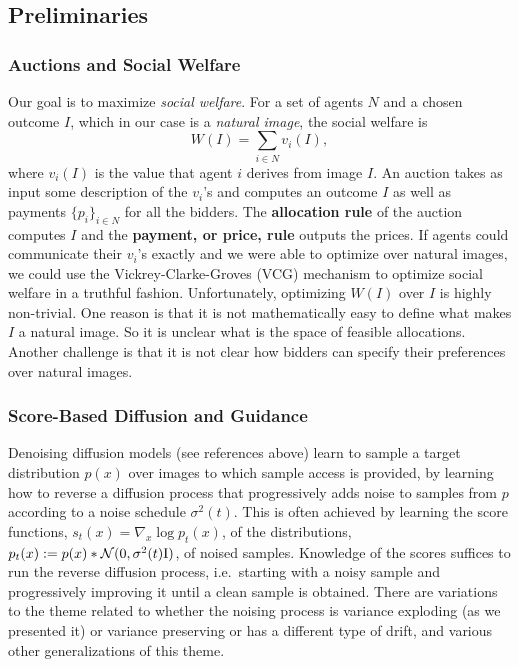 \documentclass[format=acmsmall, review=false]{acmart}
\begin{document}
\subsection{Preliminaries}
\label{sec:preliminaries}

\subsubsection{Auctions and Social Welfare}
Our goal is to maximize {\em social welfare}. For a set of agents $N$ and a chosen outcome $I$, which in our case is a {\em natural image}, the social welfare is 
\begin{equation}
W(I) = \sum_{i \in N} v_i(I),
\end{equation}
where $v_i(I)$ is the value that agent $i$ derives from image $I$. An auction takes as input some description of the $v_i$'s and computes an outcome $I$ as well as payments $\{p_i\}_{i \in N}$ for all the bidders. The {\bf allocation rule} of the auction computes $I$ and the {\bf payment, or price, rule} outputs the prices.  If agents could communicate their $v_i$'s exactly and we were able to optimize over natural images, we could use the Vickrey-Clarke-Groves (VCG) mechanism to optimize social welfare in a truthful fashion. Unfortunately, optimizing $W(I)$ over $I$ is highly non-trivial. One reason is that it is not mathematically easy to define what makes $I$ a natural image. So it is unclear what is the space of feasible allocations. Another challenge is that it is not clear how bidders can specify their preferences over natural images.

\subsubsection{Score-Based Diffusion and Guidance}
Denoising diffusion models (see references above) learn to sample a target distribution $p(x)$ over images to which sample access is provided, by learning how to reverse a diffusion process that progressively adds noise to samples from  $p$ according to a noise schedule $\sigma^2(t)$. This is often achieved by learning the score functions, $s_t(x) = \nabla_{x} \log p_t(x)$, of the distributions, $p_t(x):=p(x)\ast {\mathcal N}(0,\sigma^2(t){\rm I})$, of noised samples. Knowledge of the scores suffices to run the reverse diffusion process, i.e.~starting with a noisy sample and progressively improving it until a clean sample is obtained. There are variations to the theme related to whether the noising process is variance exploding (as we presented it) or variance preserving or has a different type of drift, and various other generalizations of this theme. 
\end{document}
